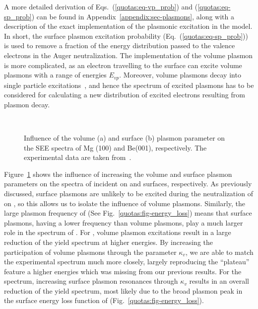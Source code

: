 \begin{refsection}
A more detailed derivation of Eqs.~(\ref{quotas:eq-vp_prob}) and 
(\ref{quotas:eq-sp_prob}) can be found in Appendix~\ref{appendix:sec-plasmons},
along with a description of the exact implementation of the plasmonic 
excitation in the model. In short, the surface plasmon excitation probability 
(Eq.~(\ref{quotas:eq-sp_prob})) is used to remove a fraction of the energy 
distribution passed to the valence electrons in the Auger neutralization. The 
implementation of the volume plasmon is more complicated, as an electron 
travelling to the surface can excite volume plasmons with a range of energies 
$E_{vp}$. Moreover, volume plasmons decay into single particle 
excitations~\cite{Maier2007}, and hence the spectrum of excited 
plasmons has to be considered for calculating a new distribution of excited 
electrons resulting from plasmon decay. 
 
\begin{figure}[ht] 
    \centering 
    \captionsetup{width=0.9\textwidth}
    \begin{subfigure}[t]{0.49\textwidth} 
        \centering 
         
        \caption{} 
    \end{subfigure}%
    ~  
    \begin{subfigure}[t]{0.49\textwidth} 
        \centering 
         
        \caption{} 
    \end{subfigure} 
\caption{Influence of the volume (a)  and surface (b) plasmon parameter on the 
SEE spectra of Mg (100) and Be(001), respectively. The experimental data are 
taken from~\cite{Baragiola2001}.} 
\label{quotas:fig-plasmon_influence} 
\end{figure} 
 
Figure~\ref{quotas:fig-plasmon_influence} shows the influence of increasing 
the volume and surface plasmon parameters on the spectra of  incident 
on  and  surfaces, respectively. As previously 
discussed, surface plasmons are unlikely to be excited during the neutralization 
of  on , so this allows us to isolate the influence of volume plasmons. 
Similarly, the large plasmon frequency of  
(See Fig.~\ref{quotas:fig-energy_loss}) means that surface plasmons, 
having a lower frequency than volume plasmons, play a much larger role in the 
spectrum of . For , volume 
plasmon excitations result in a large reduction of the yield spectrum at 
higher energies. By increasing the participation of volume plasmons through 
the parameter $\kappa_v$, we are able to match the experimental spectrum much 
more closely, largely reproducing the ``plateau'' feature a higher energies 
which was missing from our previous results. For the  spectrum, 
increasing surface plasmon resonances through $\kappa_v$ results in an overall 
reduction of the yield spectrum, most likely due to the broad plasmon peak in 
the surface energy loss function of  (Fig.~\ref{quotas:fig-energy_loss}). 


\end{refsection}
